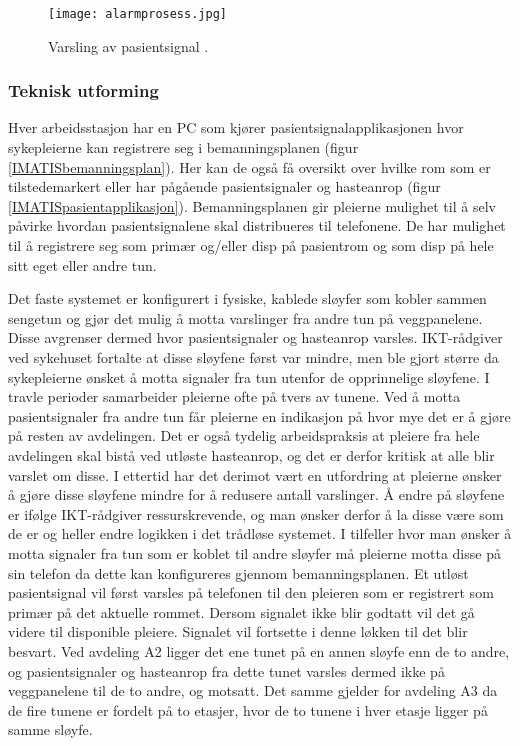 \begin{figure}[H]
\centering
\texttt{[image: alarmprosess.jpg]}
\caption{Varsling av pasientsignal \citep{BrukerveiledningforPasientsignal}.}
\label{fig:detteskjer}
\end{figure}

\subsubsection{Teknisk utforming}
Hver arbeidsstasjon har en PC som kjører pasientsignalapplikasjonen hvor sykepleierne kan registrere seg i bemanningsplanen (figur \ref{IMATISbemanningsplan}). Her kan de også få oversikt over hvilke rom som er tilstedemarkert eller har pågående pasientsignaler og hasteanrop (figur \ref{IMATISpasientapplikasjon}). Bemanningsplanen gir pleierne mulighet til å selv påvirke hvordan pasientsignalene skal distribueres til telefonene. De har mulighet til å registrere seg som primær og/eller disp på pasientrom og som disp på hele sitt eget eller andre tun.

\noindent
Det faste systemet er konfigurert i fysiske, kablede sløyfer som kobler sammen sengetun og gjør det mulig å motta varslinger fra andre tun på veggpanelene. Disse avgrenser dermed hvor pasientsignaler og hasteanrop varsles. IKT-rådgiver ved sykehuset fortalte at disse sløyfene først var mindre, men ble gjort større da sykepleierne ønsket å motta signaler fra tun utenfor de opprinnelige sløyfene. I travle perioder samarbeider pleierne ofte på tvers av tunene. Ved å motta pasientsignaler fra andre tun får pleierne en indikasjon på hvor mye det er å gjøre på resten av avdelingen. Det er også tydelig arbeidspraksis at pleiere fra hele avdelingen skal bistå ved utløste hasteanrop, og det er derfor kritisk at alle blir varslet om disse. I ettertid har det derimot vært en utfordring at pleierne ønsker å gjøre disse sløyfene mindre for å redusere antall varslinger. Å endre på sløyfene er ifølge IKT-rådgiver ressurskrevende, og man ønsker derfor å la disse være som de er og heller endre logikken i det trådløse systemet.
I tilfeller hvor man ønsker å motta signaler fra tun som er koblet til andre sløyfer må pleierne motta disse på sin telefon da dette kan konfigureres gjennom bemanningsplanen. Et utløst pasientsignal vil først varsles på telefonen til den pleieren som er registrert som primær på det aktuelle rommet. Dersom signalet ikke blir godtatt vil det gå videre til disponible pleiere. Signalet vil fortsette i denne løkken til det blir besvart. Ved avdeling A2 ligger det ene tunet på en annen sløyfe enn de to andre, og pasientsignaler og hasteanrop fra dette tunet varsles dermed ikke på veggpanelene til de to andre, og motsatt. Det samme gjelder for avdeling A3 da de fire tunene er fordelt på to etasjer, hvor de to tunene i hver etasje ligger på samme sløyfe. 

